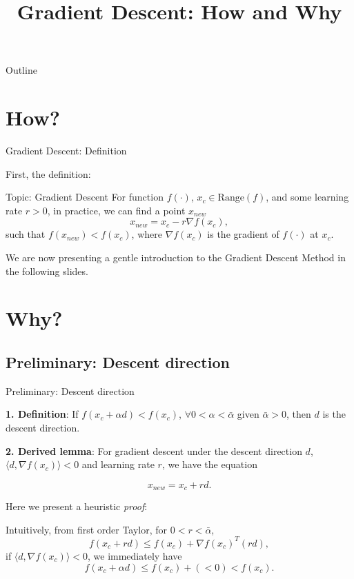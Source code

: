 \documentclass[9pt,handout]{beamer}
\title{Gradient Descent: How and Why}
\begin{document}
{
\beamertemplatenavigationsymbolsempty
\begin{frame}[plain]
\titlepage
\end{frame}
}


\begin{frame}{Outline} 
\tableofcontents 
\end{frame} 

\addtocounter{framenumber}{-2}
\section{How?}

\begin{frame}{Gradient Descent: Definition}

First, the definition:

\begin{block}{Topic: Gradient Descent}
	 For function $f(\cdot)$, $x_c\in\text{Range}(f)$, and some learning rate $r>0$, in practice, we can find a point $x_{new}$
	$$x_{new}=x_c-r\nabla f(x_c),$$
	such that $f(x_{new})<f(x_c)$, where $\nabla f(x_c)$ is the gradient of $f(\cdot)$ at $x_c$.
\end{block}

We are now presenting a gentle introduction to the Gradient Descent Method in the following slides.

\end{frame}

\addtocounter{framenumber}{-2}
\section{Why?}
\subsection{Preliminary: Descent direction}

\begin{frame}{Preliminary: Descent direction }

\noindent \textbf{1. Definition}: If $f(x_c+\alpha d)<f(x_c)$, $\forall 0<\alpha < \bar\alpha$ given $\bar\alpha>0$, then $d$ is the descent direction.

\noindent \textbf{2. Derived lemma}: For gradient descent under the descent direction $d$, $\langle d, \nabla f(x_c)\rangle<0$ and learning rate $r$, we have the equation

$$x_{new} = x_c + r d.$$

Here we present a heuristic \textit{proof}:

Intuitively, from first order Taylor, for $0<r < \bar\alpha$,
$$f(x_c+r d) \le f(x_c) + \nabla f(x_c)^T(r d),$$
if $\langle d, \nabla f(x_c)\rangle<0$, we immediately have
$$f(x_c+\alpha d) \le f(x_c)+(<0)<f(x_c).$$

\end{frame}
\end{document}
